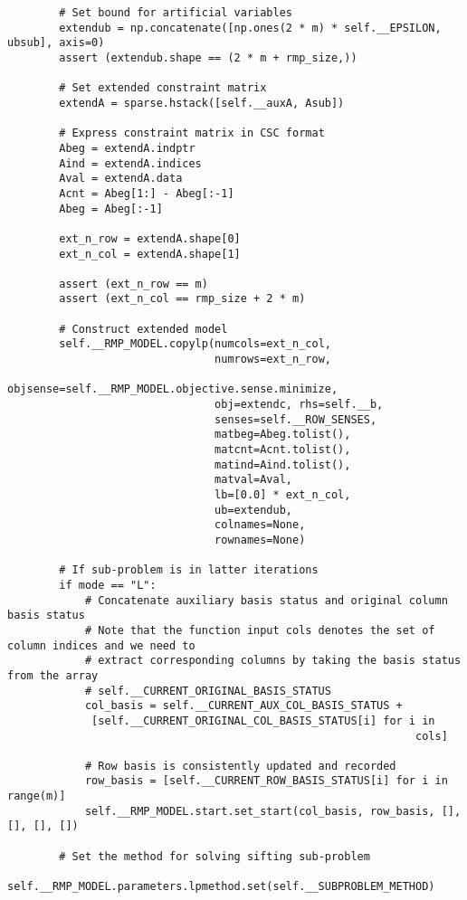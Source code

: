 \documentclass{article}
\begin{document}
\begin{lstlisting}
        # Set bound for artificial variables
        extendub = np.concatenate([np.ones(2 * m) * self.__EPSILON, ubsub], axis=0)
        assert (extendub.shape == (2 * m + rmp_size,))

        # Set extended constraint matrix
        extendA = sparse.hstack([self.__auxA, Asub])

        # Express constraint matrix in CSC format
        Abeg = extendA.indptr
        Aind = extendA.indices
        Aval = extendA.data
        Acnt = Abeg[1:] - Abeg[:-1]
        Abeg = Abeg[:-1]

        ext_n_row = extendA.shape[0]
        ext_n_col = extendA.shape[1]

        assert (ext_n_row == m)
        assert (ext_n_col == rmp_size + 2 * m)

        # Construct extended model
        self.__RMP_MODEL.copylp(numcols=ext_n_col,
                                numrows=ext_n_row,
                                objsense=self.__RMP_MODEL.objective.sense.minimize,
                                obj=extendc, rhs=self.__b,
                                senses=self.__ROW_SENSES,
                                matbeg=Abeg.tolist(),
                                matcnt=Acnt.tolist(),
                                matind=Aind.tolist(),
                                matval=Aval,
                                lb=[0.0] * ext_n_col,
                                ub=extendub,
                                colnames=None,
                                rownames=None)

        # If sub-problem is in latter iterations
        if mode == "L":
            # Concatenate auxiliary basis status and original column basis status
            # Note that the function input cols denotes the set of column indices and we need to
            # extract corresponding columns by taking the basis status from the array
            # self.__CURRENT_ORIGINAL_BASIS_STATUS
            col_basis = self.__CURRENT_AUX_COL_BASIS_STATUS +
             [self.__CURRENT_ORIGINAL_COL_BASIS_STATUS[i] for i in
                                                               cols]

            # Row basis is consistently updated and recorded
            row_basis = [self.__CURRENT_ROW_BASIS_STATUS[i] for i in range(m)]
            self.__RMP_MODEL.start.set_start(col_basis, row_basis, [], [], [], [])

        # Set the method for solving sifting sub-problem
        self.__RMP_MODEL.parameters.lpmethod.set(self.__SUBPROBLEM_METHOD)


\end{lstlisting}
\end{document}
